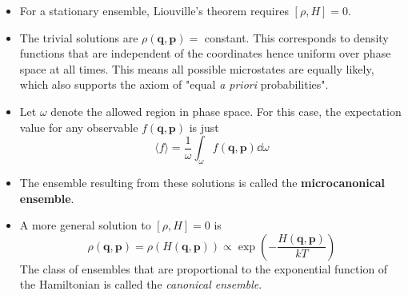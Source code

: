 \documentclass{article}
\newcommand{\ve}{\mathbf}
\begin{document}
\begin{itemize}
    \item For a stationary ensemble, Liouville's theorem requires $[\rho,H]=0$.
    \item The trivial solutions are $\rho(\ve q, \ve p)=$ constant. This corresponds to density functions that are independent of the coordinates hence uniform over phase space at all times. This means all possible microstates are equally likely, which also supports the axiom of "equal \textit{a priori} probabilities".
    \item Let $\omega$ denote the allowed region in phase space. For this case, the expectation value for any observable $f(\ve q,\ve p)$ is just
    \begin{equation}
        \langle f\rangle = \frac{1}{\omega}\int_{\omega}f(\ve q,\ve p)\dd\omega
    \end{equation}
    \item The ensemble resulting from these solutions is called the \textbf{microcanonical ensemble}.
    \item A more general solution to $[\rho,H]=0$ is 
    \begin{equation}
        \rho(\ve q, \ve p)=\rho(H(\ve q, \ve p))\propto\exp\left(-\frac{H(\ve q,\ve p)}{kT}\right)
    \end{equation}
    The class of ensembles that are proportional to the exponential function of the Hamiltonian is called the \textit{canonical ensemble}.
\end{itemize}
\end{document}
